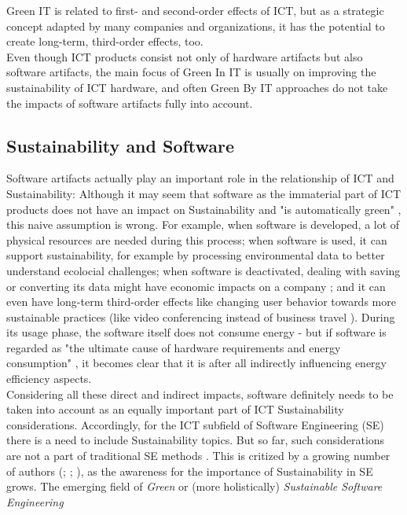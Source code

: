 \documentclass[oribibl]{llncs}
\begin{document}
Green IT is related to first- and second-order effects of ICT, but as a strategic concept adapted by many companies and organizations, it has the potential to create long-term, third-order effects, too.\\
Even though ICT products consist not only of hardware artifacts but also software artifacts, the main focus of Green In IT is usually on improving the sustainability of ICT hardware, %
and often Green By IT approaches do not take the impacts of software artifacts fully into account. %

\subsection{Sustainability and Software}
Software artifacts actually play an important role in the relationship of ICT and Sustainability: Although it may seem that software as the immaterial part of ICT products does not have an impact on Sustainability and "is automatically green" \cite[p.\,3]{agarwal_sustainable_2012}, this naive assumption is wrong. For example, when software is developed, a lot of physical resources are needed during this process; when software is used, it can support sustainability, for example by processing environmental data to better understand ecolocial challenges; when software is deactivated, dealing with saving or converting its data might have economic impacts on a company \cite{johann_sustainable_2011}; and it can even have long-term third-order effects like changing user behavior towards more sustainable practices (like video conferencing instead of business travel \cite{amsel_toward_2011}). During its usage phase, the software itself does not consume energy - but if software is regarded as "the ultimate cause of hardware requirements and energy consumption" \cite[p.\,1]{kern_impacts_2015}, it becomes clear that it is after all indirectly influencing energy efficiency aspects.\\
Considering all these direct and indirect impacts, software definitely needs to be taken into account as an equally important part of ICT Sustainability considerations. Accordingly, for the ICT subfield of Software Engineering (SE) there is a need to include Sustainability topics. But so far, such considerations are not a part of traditional SE methods \cite{penzenstadler_supporting_2012}.  This is critized by a growing number of authors (\cite{penzenstadler_supporting_2012}; \cite{agarwal_sustainable_2012}; \cite{amsel_toward_2011}), as the awareness for the importance of Sustainability in SE grows. The emerging field of \textit{Green} or (more holistically) \textit{Sustainable Software Engineering} %
\end{document}
